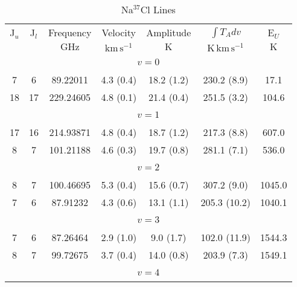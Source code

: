 \begin{table*}[htp]
\centering
\caption{Na$^{37}$Cl Lines}
\begin{tabular}{ccccccc}
\label{tab:Na37Cl_salt_lines}
 J$_u$ & J$_l$ & Frequency & Velocity & Amplitude & $\int T_A dv$ & E$_U$ \\
  &  & $\mathrm{GHz}$ & $\mathrm{km\,s^{-1}}$ & $\mathrm{K}$ & $\mathrm{K\,km\,s^{-1}}$ & $\mathrm{K}$ \\
\hline
&\vspace{-0.75em}\\
\multicolumn{7}{c}{$v = 0$} \\
\vspace{-0.75em}\\
 7 & 6 & 89.22011 & 4.3 (0.4) & 18.2 (1.2) & 230.2 (8.9) & 17.1 \\
 18 & 17 & 229.24605 & 4.8 (0.1) & 21.4 (0.4) & 251.5 (3.2) & 104.6 \\
&\vspace{-0.75em}\\
\multicolumn{7}{c}{$v = 1$} \\
\vspace{-0.75em}\\
 17 & 16 & 214.93871 & 4.8 (0.4) & 18.7 (1.2) & 217.3 (8.8) & 607.0 \\
 8 & 7 & 101.21188 & 4.6 (0.3) & 19.7 (0.8) & 281.1 (7.1) & 536.0 \\
&\vspace{-0.75em}\\
\multicolumn{7}{c}{$v = 2$} \\
\vspace{-0.75em}\\
 8 & 7 & 100.46695 & 5.3 (0.4) & 15.6 (0.7) & 307.2 (9.0) & 1045.0 \\
 7 & 6 & 87.91232 & 4.3 (0.6) & 13.1 (1.1) & 205.3 (10.2) & 1040.1 \\
&\vspace{-0.75em}\\
\multicolumn{7}{c}{$v = 3$} \\
\vspace{-0.75em}\\
 7 & 6 & 87.26464 & 2.9 (1.0) & 9.0 (1.7) & 102.0 (11.9) & 1544.3 \\
 8 & 7 & 99.72675 & 3.7 (0.4) & 14.0 (0.8) & 203.9 (7.3) & 1549.1 \\
&\vspace{-0.75em}\\
\multicolumn{7}{c}{$v = 4$} \\
\vspace{-0.75em}\\

\end{tabular}
\end{table*}
